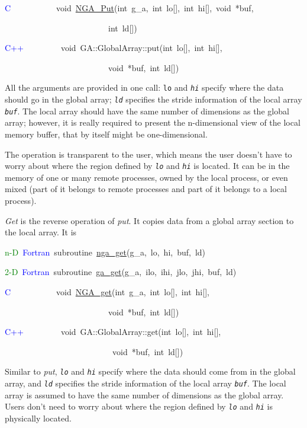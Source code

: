 \textcolor{blue}{C}~~~~~~~~~~~void~\href{https://hpc.pnl.gov/globalarrays/api/c_op_api.html\#PUT}{NGA\_{}Put}(int~g\_a,~int~lo{[}{]},~int~hi{[}{]},~void~{*}buf,~

~~~~~~~~~~~~~~~~~~~~~~~~~int~ld{[}{]})~

\textcolor{blue}{C++}~~~~~~~~~void~GA::GlobalArray::put(int~lo{[}{]},~int~hi{[}{]},~

~~~~~~~~~~~~~~~~~~~~~~~~~void~{*}buf,~int~ld{[}{]})

All the arguments are provided in one call: \texttt{lo} and \texttt{\emph{hi}}
specify where the data should go in the global array; \texttt{\emph{ld}}
specifies the stride information of the local array \texttt{\emph{buf}}.
The local array should have the same number of dimensions as the global
array; however, it is really required to present the n-dimensional
view of the local memory buffer, that by itself might be one-dimensional.

The operation is transparent to the user, which means the user doesn't
have to worry about where the region defined by \texttt{\emph{lo}}
and \texttt{\emph{hi}} is located. It can be in the memory of one
or many remote processes, owned by the local process, or even mixed
(part of it belongs to remote processes and part of it belongs to
a local process).

\emph{Get} is the reverse operation of \emph{put}. It copies data
from a global array section to the local array. It is

\textcolor{green}{n-D}~\textcolor{blue}{Fortran}~subroutine~\href{https://hpc.pnl.gov/globalarrays/api/f_op_api.html\#ga_get}{nga\_{}get}(g\_a,~lo,~hi,~buf,~ld)~

\textcolor{green}{2-D}~\textcolor{blue}{Fortran}~subroutine~\href{https://hpc.pnl.gov/globalarrays/api/f_op_api.html\#ga_get}{ga\_{}get}(g\_a,~ilo,~ihi,~jlo,~jhi,~buf,~ld)~

\textcolor{blue}{C}~~~~~~~~~~~void~\href{https://hpc.pnl.gov/globalarrays/api/c_op_api.html\#ga_get}{NGA\_{}get}(int~g\_a,~int~lo{[}{]},~int~hi{[}{]},~

~~~~~~~~~~~~~~~~~~~~~~~~~void~{*}buf,~int~ld{[}{]})~

\textcolor{blue}{C++}~~~~~~~~~void~GA::GlobalArray::get(int~lo{[}{]},~int~hi{[}{]},~

~~~~~~~~~~~~~~~~~~~~~~~~~~void~{*}buf,~int~ld{[}{]})

Similar to \emph{put}, \texttt{\emph{lo}} and \texttt{\emph{hi}} specify
where the data should come from in the global array, and \texttt{\emph{ld}}
specifies the stride information of the local array \texttt{\emph{buf}}.
The local array is assumed to have the same number of dimensions as
the global array. Users don't need to worry about where the region
defined by \texttt{\emph{lo}} and \texttt{\emph{hi}} is physically
located.

